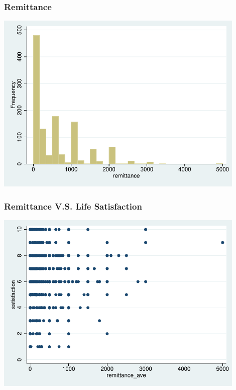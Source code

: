 \documentclass[10pt]{beamer}
\begin{document}
\begin{frame}[c]\frametitle{Remittance}
\begin{center}
\includegraphics[width=0.9\textwidth]{remittance.pdf}
\end{center}
\end{frame}

\begin{frame}[c]\frametitle{Remittance V.S. Life Satisfaction}
\begin{center}
\includegraphics[width=0.9\textwidth]{satisfaction_remittance_ave.pdf}
\end{center}
\end{frame}
\end{document}
